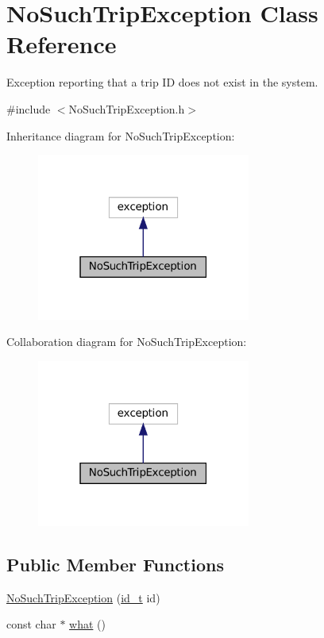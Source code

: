 \hypertarget{classNoSuchTripException}{}\section{No\+Such\+Trip\+Exception Class Reference}
\label{classNoSuchTripException}


Exception reporting that a trip ID does not exist in the system.  




{\ttfamily \#include $<$No\+Such\+Trip\+Exception.\+h$>$}



Inheritance diagram for No\+Such\+Trip\+Exception\+:
\nopagebreak
\begin{figure}[H]
\begin{center}
\leavevmode
\includegraphics[width=199pt]{classNoSuchTripException__inherit__graph}
\end{center}
\end{figure}


Collaboration diagram for No\+Such\+Trip\+Exception\+:
\nopagebreak
\begin{figure}[H]
\begin{center}
\leavevmode
\includegraphics[width=199pt]{classNoSuchTripException__coll__graph}
\end{center}
\end{figure}
\subsection*{Public Member Functions}
\begin{DoxyCompactItemize}
\item 
\mbox{\hyperlink{classNoSuchTripException_ad4e2e75706508833ccbb7a793092734c}{No\+Such\+Trip\+Exception}} (\mbox{\hyperlink{project__utils_8h_a8f3a969054ad2200720b96e7e23dd4e1}{id\+\_\+t}} id)
\item 
const char $\ast$ \mbox{\hyperlink{classNoSuchTripException_a48adffc40883e044fd248f1185084bb6}{what}} ()
\end{DoxyCompactItemize}


